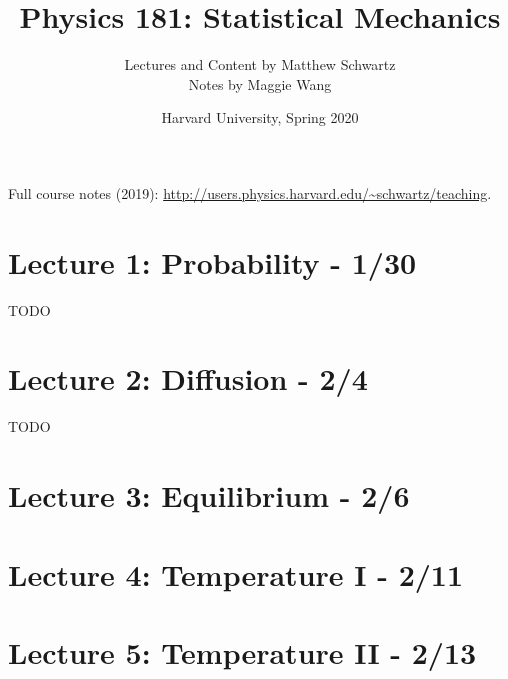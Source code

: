 \documentclass[8pt]{article}
\title{Physics 181: Statistical Mechanics}
\author{Lectures and Content by Matthew Schwartz \\
Notes by Maggie Wang}
\date{Harvard University, Spring 2020}
\begin{document}
\small

\maketitle

\noindent Full course notes (2019): \url{http://users.physics.harvard.edu/~schwartz/teaching}.

\begin{multicols*}{2}
  \tableofcontents
\end{multicols*}

\newpage

\fancyhfoffset[E,O]{0pt}


\twocolumn

\section{Lecture 1: Probability - 1/30}
TODO

\clearpage

\section{Lecture 2: Diffusion - 2/4}
TODO

\clearpage

\section{Lecture 3: Equilibrium - 2/6}



\clearpage

\section{Lecture 4: Temperature I - 2/11}



\clearpage

\section{Lecture 5: Temperature II - 2/13}
\end{document}

